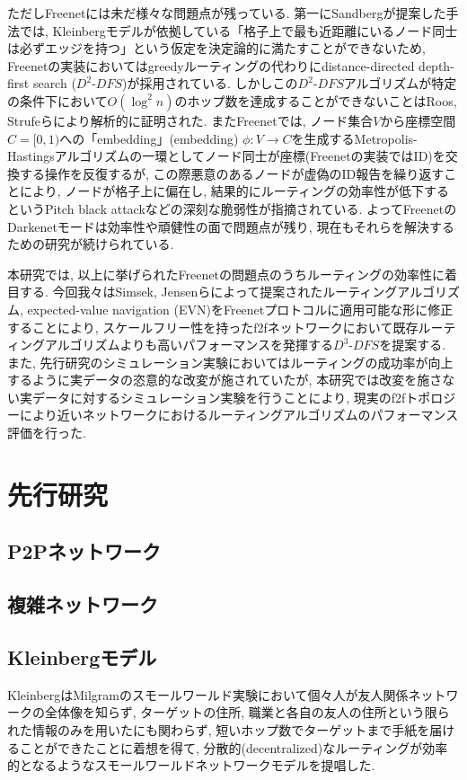 \documentclass[dvipdfmx]{ampbt}
\begin{document}
ただしFreenetには未だ様々な問題点が残っている. 第一にSandbergが提案した手法では, Kleinbergモデルが依拠している「格子上で最も近距離にいるノード同士は必ずエッジを持つ」という仮定を決定論的に満たすことができないため, Freenetの実装においてはgreedyルーティングの代わりにdistance-directed depth-first search ($D^2$-$DFS$)が採用されている. しかしこの$D^2$-$DFS$アルゴリズムが特定の条件下において$O(\log^2 n)$のホップ数を達成することができないことはRoos, Strufeらにより解析的に証明された\cite{roos2012provable}\cite{roos2016dealing}\cite{roos2016analyzing}. またFreenetでは, ノード集合$V$から座標空間$C= [0,1)$への「\gls{embedding}」(embedding) $\phi: V \to C$を生成するMetropolis-Hastingsアルゴリズムの一環としてノード同士が座標(Freenetの実装ではID)を交換する操作を反復するが, この際悪意のあるノードが虚偽のID報告を繰り返すことにより, ノードが格子上に偏在し, 結果的にルーティングの効率性が低下するというPitch black attack\cite{evans2007routing}などの深刻な脆弱性が指摘されている. よってFreenetのDarkenetモードは効率性や頑健性の面で問題点が残り, 現在もそれらを解決するための研究が続けられている.

本研究では, 以上に挙げられたFreenetの問題点のうちルーティングの効率性に着目する. 今回我々はSimsek, Jensenらによって提案されたルーティングアルゴリズム, expected-value navigation (EVN)\cite{csimcsek2008navigating}をFreenetプロトコルに適用可能な形に修正することにより, スケールフリー性を持った\acrshort{f2f}ネットワークにおいて既存ルーティングアルゴリズムよりも高いパフォーマンスを発揮する$D^3$-$DFS$を提案する. また, 先行研究のシミュレーション実験においてはルーティングの成功率が向上するように実データの恣意的な改変が施されていたが, 本研究では改変を施さない実データに対するシミュレーション実験を行うことにより, 現実の\acrshort{f2f}トポロジーにより近いネットワークにおけるルーティングアルゴリズムのパフォーマンス評価を行った.

 \section{先行研究}
   \subsection{P2Pネットワーク}
   \subsection{複雑ネットワーク}
   \subsection{Kleinbergモデル} \label{sec:kleinberg}
   KleinbergはMilgramのスモールワールド実験において個々人が友人関係ネットワークの全体像を知らず, ターゲットの住所, 職業と各自の友人の住所という限られた情報のみを用いたにも関わらず, 短いホップ数でターゲットまで手紙を届けることができたことに着想を得て, 分散的(decentralized)なルーティングが効率的となるようなスモールワールドネットワークモデルを提唱した\cite{kleinberg2000small}.
\end{document}
